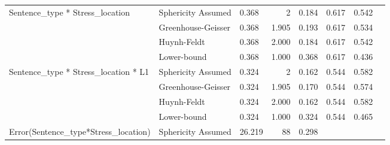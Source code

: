 \documentclass[a4paper]{article}
\begin{document}
\begin{table}[H]
\begin{tabular}{p{}p{}|l|r|r|r|r|r|}
\hline
\multirow{4}{*}{Sentence\_type * Stress\_location}      & Sphericity Assumed & 0.368                                        & 2                       & 0.184                            & 0.617                  & 0.542                      \\ 
\cline{2-7}
                                                        & Greenhouse-Geisser & 0.368                                        & 1.905                   & 0.193                            & 0.617                  & 0.534                      \\ 
\cline{2-7}
                                                        & Huynh-Feldt        & 0.368                                        & 2.000                   & 0.184                            & 0.617                  & 0.542                      \\ 
\cline{2-7}
                                                        & Lower-bound        & 0.368                                        & 1.000                   & 0.368                            & 0.617                  & 0.436                      \\ 
\hline
\multirow{4}{*}{Sentence\_type * Stress\_location * L1} & Sphericity Assumed & 0.324                                        & 2                       & 0.162                            & 0.544                  & 0.582                      \\ 
\cline{2-7}
                                                        & Greenhouse-Geisser & 0.324                                        & 1.905                   & 0.170                            & 0.544                  & 0.574                      \\ 
\cline{2-7}
                                                        & Huynh-Feldt        & 0.324                                        & 2.000                   & 0.162                            & 0.544                  & 0.582                      \\ 
\cline{2-7}
                                                        & Lower-bound        & 0.324                                        & 1.000                   & 0.324                            & 0.544                  & 0.465                      \\ 
\hline
\multirow{4}{*}{Error(Sentence\_type*Stress\_location)} & Sphericity Assumed & 26.219                                       & 88                      & 0.298                            & \multicolumn{1}{l|}{~} & \multicolumn{1}{l|}{~}     \\ 

\end{tabular}
\end{table}
\end{document}
